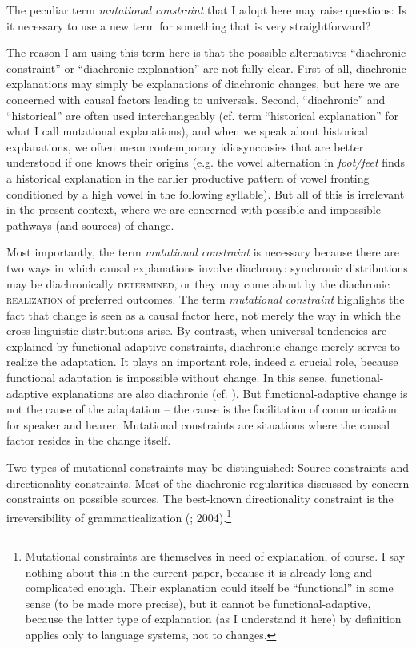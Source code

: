 \documentclass[output=paper]{langsci/langscibook}
\begin{document}
The peculiar term \textit{mutational constraint} that I adopt here may raise questions: Is it necessary to use a new term for something that is very straightforward? 

The reason I am using this term here is that the possible alternatives “diachronic constraint” or “diachronic explanation” are not fully clear. First of all, diachronic explanations may simply be explanations of diachronic changes, but here we are concerned with causal factors leading to universals. Second, “diachronic” and “historical” are often used interchangeably (cf.  term “historical explanation” for what I call mutational explanations), and when we speak about historical explanations, we often mean contemporary idiosyncrasies that are better understood if one knows their origins (e.g. the vowel alternation in \textit{foot/feet} finds a historical explanation in the earlier productive pattern of vowel fronting conditioned by a high vowel in the following syllable). But all of this is irrelevant in the present context, where we are concerned with possible and impossible pathways (and sources) of change.

Most importantly, the term \textit{mutational constraint} is necessary because there are two ways in which causal explanations involve diachrony: synchronic distributions may be diachronically \textsc{determined}, or they may come about by the diachronic \textsc{realization} of preferred outcomes. The term \textit{mutational constraint} highlights the fact that change is seen as a causal factor here, not merely the way in which the cross-linguistic distributions arise. By contrast, when universal tendencies are explained by functional-adaptive constraints, diachronic change merely serves to realize the adaptation. It plays an important role, indeed a crucial role, because functional adaptation is impossible without change. In this sense, functional-adaptive explanations are also diachronic (cf. \citealt{Haspelmath1999a}). But functional-adaptive change is not the cause of the adaptation – the cause is the facilitation of communication for speaker and hearer. Mutational constraints are situations where the causal factor resides in the change itself.

Two types of mutational constraints may be distinguished: Source constraints and directionality constraints. Most of the diachronic regularities discussed by \citet{Cristofaro2017} concern constraints on possible sources. The best-known directionality constraint is the irreversibility of grammaticalization (\citealt{Haspelmath1999b}; 2004).\footnote{Mutational constraints are themselves in need of explanation, of course. I say nothing about this in the current paper, because it is already long and complicated enough. Their explanation could itself be “functional” in some sense (to be made more precise), but it cannot be functional-adaptive, because the latter type of explanation (as I understand it here) by definition applies only to language systems, not to changes.} 
\end{document}
